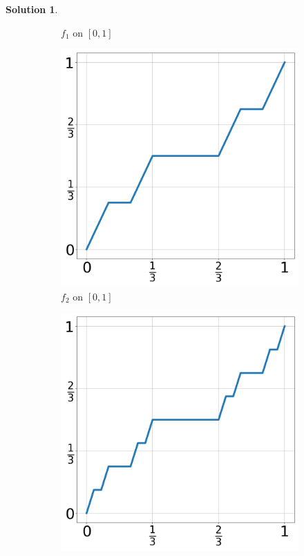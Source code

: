 \documentclass[12pt]{article}
\theoremstyle{definition}
\theoremstyle{exercise}
\theoremstyle{solution}
\newtheorem*{solution}{Solution}
\begin{document}
\begin{solution}
\begin{enumerate}
\begin{figure}[H]
\begin{subfigure}{0.47\textwidth}
                \caption{\( f_1 \) on \( [0, 1] \)}
                \label{fig:1sub2}
            \end{subfigure}

            \begin{subfigure}{0.47\textwidth}
                \centering
                \includegraphics[width=\linewidth]{UA_Section_6_2_Figure_3.png}
                \caption{\( f_2 \) on \( [0, 1] \)}
                \label{fig:1sub3}
            \end{subfigure}%
            \begin{subfigure}{0.47\textwidth}
                \centering
                \includegraphics[width=\linewidth]{UA_Section_6_2_Figure_4.png}

\end{subfigure}
\end{figure}
\end{enumerate}
\end{solution}
\end{document}
